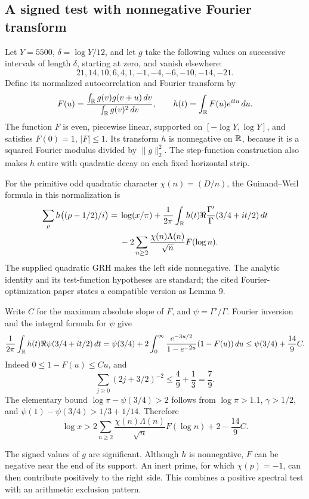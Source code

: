 \subsection{A signed test with nonnegative Fourier transform}

Let $Y=5500$, $\delta=\log Y/12$, and let $g$ take the following values on successive intervals of length $\delta$, starting at zero, and vanish elsewhere:
\[
 21,14,10,6,4,1,-1,-4,-6,-10,-14,-21.
\]
Define its normalized autocorrelation and Fourier transform by
\[
 F(u)=\frac{\int_\mathbb R g(v)g(v+u)\,dv}{\int_\mathbb R g(v)^2\,dv},
 \qquad h(t)=\int_\mathbb R F(u)e^{itu}\,du.
\]
The function $F$ is even, piecewise linear, supported on $[-\log Y,\log Y]$, and satisfies $F(0)=1$, $|F|\le1$. Its transform $h$ is nonnegative on $\mathbb R$, because it is a squared Fourier modulus divided by $\|g\|_2^2$. The step-function construction also makes $h$ entire with quadratic decay on each fixed horizontal strip.

For the primitive odd quadratic character $\chi(n)=(D/n)$, the Guinand--Weil formula in this normalization is
\begin{align}
 \sum_\rho h\bigl((\rho-1/2)/i\bigr)
 ={}&\log(x/\pi)
 +\frac1{2\pi}\int_\mathbb R h(t)\Re\frac{\Gamma'}\Gamma(3/4+it/2)\,dt\notag\\
 &-2\sum_{n\ge2}\frac{\chi(n)\Lambda(n)}{\sqrt n}F(\log n).
 \label{eq:explicit6}
\end{align}
The supplied quadratic GRH makes the left side nonnegative. The analytic identity and its test-function hypotheses are standard; the cited Fourier-optimization paper states a compatible version as Lemma 9.\cite{Carneiro}

Write $C$ for the maximum absolute slope of $F$, and $\psi=\Gamma'/\Gamma$. Fourier inversion and the integral formula for $\psi$ give
\[
 \frac1{2\pi}\int_\mathbb R h(t)\Re\psi(3/4+it/2)\,dt
 =\psi(3/4)+2\int_0^\infty
   \frac{e^{-3u/2}}{1-e^{-2u}}(1-F(u))\,du
 \le\psi(3/4)+\frac{14}9 C.
\]
Indeed $0\le1-F(u)\le Cu$, and
\[
 \sum_{j\ge0}(2j+3/2)^{-2}\le\frac49+\frac13=\frac79.
\]
The elementary bound $\log\pi-\psi(3/4)>2$ follows from
$\log\pi>1.1$, $\gamma>1/2$, and
$\psi(1)-\psi(3/4)>1/3+1/14$. Therefore
\begin{equation}\label{eq:prime-test6}
 \log x>
 2\sum_{n\ge2}\frac{\chi(n)\Lambda(n)}{\sqrt n}F(\log n)
 +2-\frac{14}9 C.
\end{equation}

The signed values of $g$ are significant. Although $h$ is nonnegative, $F$ can be negative near the end of its support. An inert prime, for which $\chi(p)=-1$, can then contribute positively to the right side. This combines a positive spectral test with an arithmetic exclusion pattern.

